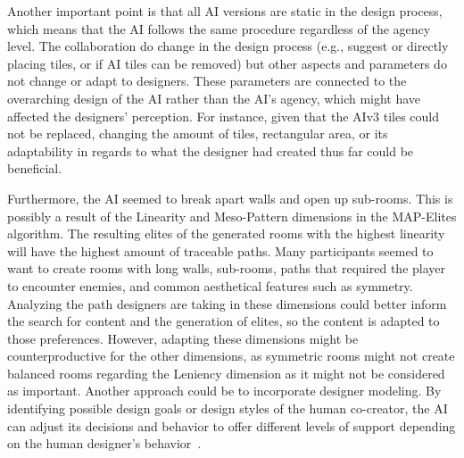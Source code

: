 Another important point is that all AI versions are static in the design process, which means that the AI follows the same procedure regardless of the agency level. The collaboration do change in the design process (e.g., suggest or directly placing tiles, or if AI tiles can be removed) but other aspects and parameters do not change or adapt to designers. These parameters are connected to the overarching design of the AI rather than the AI's agency, which might have affected the designers' perception. For instance, given that the AIv3 tiles could not be replaced, changing the amount of tiles, rectangular area, or its adaptability in regards to what the designer had created thus far could be beneficial.




Furthermore, the AI seemed to break apart walls and open up sub-rooms. This is possibly a result of the Linearity and Meso-Pattern dimensions in the MAP-Elites algorithm. The resulting elites of the generated rooms with the highest linearity will have the highest amount of traceable paths. Many participants seemed to want to create rooms with long walls, sub-rooms, paths that required the player to encounter enemies, and common aesthetical features such as symmetry. Analyzing the path designers are taking in these dimensions could better inform the search for content and the generation of elites, so the content is adapted to those preferences. However, adapting these dimensions might be counterproductive for the other dimensions, as symmetric rooms might not create balanced rooms regarding the Leniency dimension as it might not be considered as important. Another approach could be to incorporate designer modeling. By identifying possible design goals or design styles of the human co-creator, the AI can adjust its decisions and behavior to offer different levels of support depending on the human designer's behavior~\cite{p13liapis_designer_2013,alvarez_designer_2022}. 


